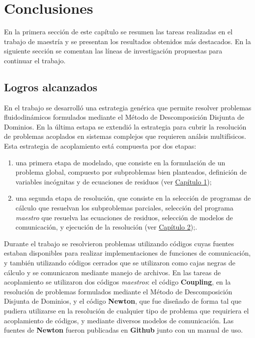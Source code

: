 \chapter{Conclusiones}
\label{conclusiones}

En la primera sección de este capítulo se resumen las tareas realizadas en el trabajo de maestría y se presentan los resultados obtenidos más destacados.
En la siguiente sección se comentan las líneas de investigación propuestas para continuar el trabajo.

\section{Logros alcanzados}
\label{logros}

En el trabajo se desarrolló una estrategia genérica que permite resolver problemas fluidodinámicos formulados mediante el Método de Descomposición Disjunta de Dominios.
En la última estapa se extendió la estrategia para cubrir la resolución de problemas acoplados en sistemas complejos que requieren análsis multifísicos.
Esta estrategia de acoplamiento está compuesta por dos etapas:
\begin{enumerate}
\item una primera etapa de modelado, que consiste en la formulación de un problema global, compuesto por subproblemas bien planteados, definición de variables incógnitas y de ecuaciones de residuos (ver \hyperlink{chapter.1}{Capítulo 1});
\item una segunda etapa de resolución, que consiste en la selección de programas de cálculo que resuelvan los subproblemas parciales,
selección del programa \textit{maestro} que resuelva las ecuaciones de residuos, selección de modelos de comunicación, y ejecución de la resolución (ver \hyperlink{chapter.2}{Capítulo 2});.
\end{enumerate}

Durante el trabajo se resolvieron problemas utilizando códigos cuyas fuentes estaban disponibles para realizar implementaciones de funciones de comunicación,
y también utilizando códigos cerrados que se utilizaron como cajas negras de cálculo y se comunicaron mediante manejo de archivos.
En las tareas de acoplamiento se utilizaron dos códigos \textit{maestros}: el código \textbf{Coupling}, en la resolución de problemas formulados mediante el Método de Descomposición Disjunta de Dominios,
y el código \textbf{Newton}, que fue diseñado de forma tal que pudiera utilizarse en la resolución de cualquier tipo de problema que requiriera el acoplamiento de códigos,
y mediante diversos modelos de comunicación.
Las fuentes de \textbf{Newton} fueron publicadas en \textbf{Github} junto con un manual de uso.

